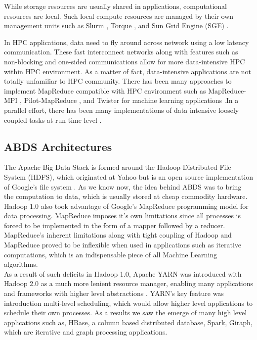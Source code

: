 \documentclass[runningheads,a4paper]{llncs}
\begin{document}
While storage resources are usually shared in applications, computational resources are local. Such local compute resources are managed by their own management units such as Slurm \cite{yoo2003slurm}, Torque \cite{staples2006torque}, and Sun Grid Engine (SGE) \cite{gentzsch2001sun}.

In HPC applications, data need to fly around across network using a low latency communication. These fast interconnect networks along with features such as non-blocking and one-sided communications allow for more data-intensive HPC within HPC environment. As a matter of fact, data-intensive applications are not totally unfamiliar to HPC community. There has been many approaches to implement MapReduce compatible with HPC environment such as MapReduce-MPI \cite{plimpton2011mapreduce}, Pilot-MapReduce \cite{mantha2012pilot}, and Twister for machine learning applications \cite{ekanayake2010twister}.In a parallel effort, there has been many implementations of data intensive loosely coupled tasks at run-time level \cite{luckow2012p}\cite{raicu2008many}\cite{deelman2009workflows}.
\subsection{ABDS Architectures}
The Apache Big Data Stack is formed around the Hadoop Distributed File System (HDFS), which originated at Yahoo but is an open source implementation of Google's file system \cite{shvachko2010hadoop} \cite{ghemawat2003google}. As we know now, the idea behind ABDS was to bring the computation to data, which is usually stored at cheap commodity hardware. Hadoop 1.0 also took advantage of Google's MapReduce programming model for data processing. MapReduce imposes it's own limitations since all processes is forced to be implemented in the form of a mapper followed by a reducer. MapReduce's inherent limitations along with tight coupling of Hadoop and MapReduce proved to be inflexible when used in applications such as iterative computations, which is an indispensable piece of all Machine Learning algorithms.\\

As a result of such deficits in Hadoop 1.0, Apache YARN was introduced with Hadoop 2.0 as a much more lenient resource manager, enabling many applications and frameworks with higher level abstractions \cite{vavilapalli2013apache}. YARN's key feature was introduction multi-level scheduling, which would allow higher level applications to schedule their own processes. As a results we saw the emerge of many high level applications such as, HBase, a column based distributed database, Spark, Giraph, which are iterative and graph processing applications\cite{borthakur2011apache}\cite{zaharia2012resilient}.
\newpage
\end{document}
